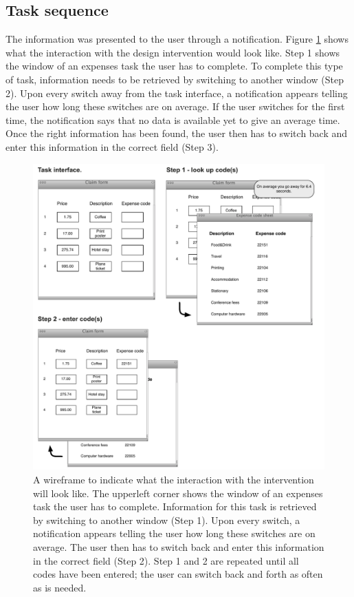\subsection{Task sequence}
The information was presented to the user through a notification. Figure \ref{fig:ch56-6_Wireframe} shows what the interaction with the design intervention would look like. Step 1 shows the window of an expenses task the user has to complete. To complete this type of task, information needs to be retrieved by switching to another window (Step 2). Upon every switch away from the task interface, a notification appears telling the user how long these switches are on average. If the user switches for the first time, the notification says that no data is available yet to give an average time. Once the right information has been found, the user then has to switch back and enter this information in the correct field (Step 3). 

\begin{figure}
\centering
\includegraphics[width=\textwidth]{images/ch56/ch56-wireframe.pdf}
\caption[Wireframe of the design intervention.]{A wireframe to indicate what the interaction with the intervention will look like. The upperleft corner shows the window of an expenses task the user has to complete. Information for this task is retrieved by switching to another window (Step 1). Upon every switch, a notification appears telling the user how long these switches are on average. The user then has to switch back and enter this information in the correct field (Step 2). Step 1 and 2 are repeated until all codes have been entered; the user can switch back and forth as often as is needed.}
\label{fig:ch56-6_Wireframe}
\end{figure}

